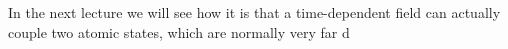 In the next lecture we will see how it is that a time-dependent field can actually couple two atomic states, which are normally very far d